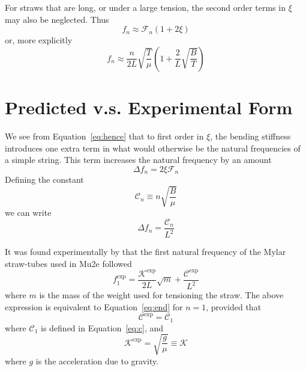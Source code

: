 \documentclass[twoside]{article}
\begin{document}
\begin{multicols}{2}
For straws that are long, or under a large tension, the second order terms in $\xi$ may also be neglected. Thus
 \begin{equation}
 \boxed{
 	f_n \approx \mathcal{F}_n (1 + 2\xi )
 }
 \end{equation}
 or, more explicitly 
  \begin{equation}
  f_n \approx  \frac{n}{2L}\sqrt{\frac{T}{\mu}}  (1 + \frac{2}{L}  \sqrt{\frac{B}{T}} )
 \label{eq:end}
  \end{equation}






\section{Predicted v.s. Experimental Form}
We see from Equation~\ref{eq:hence} that to first order in $\xi$, the bending stiffness introduces one extra term in what would otherwise be the natural frequencies of a simple string. This term increases the natural frequency by an amount
\begin{equation}
\Delta f_n =  2 \xi \mathcal{F}_n
\end{equation}
Defining the constant 
\begin{equation}
\mathcal{C}_n \equiv n \sqrt{\frac{B}{\mu}}
\label{eq:c}
\end{equation}
we can write
\begin{equation}
\Delta f_n =  \frac{\mathcal{C}_n}{L^2}
\end{equation}


It was found experimentally by \cite{david} that the first natural frequency of the Mylar straw-tubes used in Mu2e followed 
\begin{equation}
\boxed{
	f^\text{exp}_1 = \frac{\mathcal{K}^\text{exp}}{2L}\sqrt{m} + \frac{\mathcal{C}^\text{exp}}{L^2}
}
\end{equation}
where $m$ is the mass of the weight used for tensioning the straw.  The above expression is equivalent to Equation~\ref{eq:end} for $n=1$, provided that
\begin{equation}
	\mathcal{C}^\text{exp} = \mathcal{C}_1
\end{equation}
where $\mathcal{C}_1$ is defined in Equation~\ref{eq:c},
and 
\begin{equation}
\mathcal{K}^\text{exp} = \sqrt{\frac{g}{\mu}} \equiv \mathcal{K} 
\end{equation}
where $g$ is the acceleration due to gravity.






\end{multicols}
\end{document}

